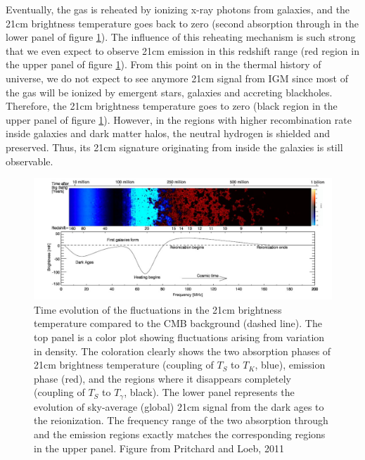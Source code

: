 \documentclass[12pt, TexShade, letterpaper]{report}
\begin{document}
Eventually, the gas is reheated by ionizing x-ray photons from galaxies\cite{21century}, and the 21cm brightness temperature goes back to zero (second absorption through in the lower panel of figure \ref{fig:global_signal_pritchard_loeb}). The influence of this reheating mechanism is such strong that we even expect to observe 21cm emission in this redshift range (red region in the upper panel of figure \ref{fig:global_signal_pritchard_loeb}). From this point on in the thermal history of universe, we do not expect to see anymore 21cm signal from IGM since most of the gas will be ionized by emergent stars, galaxies and accreting blackholes. Therefore, the 21cm brightness temperature goes to zero (black region in the upper panel of figure \ref{fig:global_signal_pritchard_loeb}). However, in the regions with higher recombination rate inside galaxies and dark matter halos, the neutral hydrogen is shielded and preserved. Thus, its 21cm signature originating from inside the galaxies is still observable\cite{map_universe}.\par
\begin{figure}[h!]
\centering
\includegraphics[scale =0.8]{global_signal_pritchard_loeb.jpg}
\caption[Time evolution of the fluctuations in the 21cm brightness temperature]{Time evolution of the fluctuations in the 21cm brightness temperature compared to the CMB background (dashed line). The top panel is a color plot showing fluctuations arising from variation in density. The coloration clearly shows the two absorption phases of 21cm brightness temperature (coupling of $T_S$ to $T_K$, blue), emission phase (red), and the regions where it disappears completely (coupling of $T_S$ to $T_\gamma$, black). The lower panel represents the evolution of sky-average (global) 21cm signal from the dark ages to the reionization. The frequency range of the two absorption through and the emission regions exactly matches the  corresponding regions in the upper panel. Figure from Pritchard and Loeb, 2011 \cite{21century}}
\label{fig:global_signal_pritchard_loeb}
\end{figure}
\end{document}
